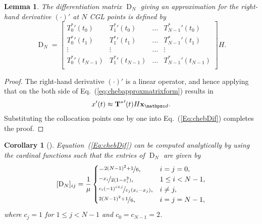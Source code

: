 \documentclass[journal]{IEEEtran}
\newtheorem{lem}{Lemma}
\newtheorem{cor}{Corollary}
\def \disc { \mathpzc d}
\begin{document}
\begin{lem}
	The differentiation matrix $\operatorname{D}_{N}  $ giving an approximation for the right-hand derivative $ (\cdot)' $ at $ N $ CGL points is defined by
	\begin{equation}\label{key}
		\operatorname{D}_{N} =
		\begin{bmatrix}
			{T_0^*}'(t_0)      & {T_1^*}'(t_0)     & \ldots & {T_{N-1}^*}'(t_0)     \\
			{T_0^*}'(t_1)      & {T_1^*}'(t_1)     & \ldots & {T_{N-1}^*}'(t_1)     \\
			\vdots             & \vdots            & \ldots & \vdots                \\
			{ T_0^*}'(t_{N-1}) & {T_1^*}'(t_{N-1}) & \ldots & {T_{N-1}^*}'(t_{N-1}) \\
		\end{bmatrix}H.
	\end{equation}
\end{lem}
\begin{proof}
	The right-hand derivative $ (\cdot)' $ is a linear operator,  and hence applying that on the both side of  Eq.~(\ref{eq:chebapproxmatrixform}) results in
	\begin{equation}\label{Eq:chebDif}
		x'(t)\approx {\mathbf T^*}'(t)H {\mathbf{x}}_{\disc} .
	\end{equation}
	Substituting the collocation points one by one into Eq.~(\ref{Eq:chebDif}) completes the proof.
\end{proof}

\begin{cor}[\cite{Trefethen2000spectral}]\label{note:D}
	Equation~(\ref{Eq:chebDif}) can be computed analytically by using the cardinal functions such that the entries of $ \operatorname{D}_{N} $ are given by
	\begin{equation}\label{Eq:FCFM}
		[\operatorname{D}_{N}]_{ij}=
		\frac{1}{\mu } \begin{cases}
			-\nicefrac{2(N-1)^2+1}{6},              & i=j=0,
			\\
			\nicefrac{-x_i}{2(1-x_i^2)},            & 1 \leq i<N-1,
			\\
			\nicefrac{c_i(-1)^{i+j}}{c_j(x_i-x_j)}, & i \neq j,
			\\
			\nicefrac{2(N-1)^2+1}{6},               & i=j=N-1,
		\end{cases}
	\end{equation}
	where $ c_j=1 $ for $ 1 \leq j <N-1 $ and $ c_0=c_{N-1}=2 $.

\end{cor}
\end{document}
